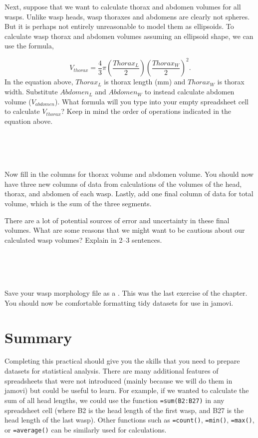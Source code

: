 \documentclass[
  openany]{krantz}
\begin{document}
Next, suppose that we want to calculate thorax and abdomen volumes for all wasps.
Unlike wasp heads, wasp thoraxes and abdomens are clearly not spheres.
But it is perhaps not entirely unreasonable to model them as ellipsoids.
To calculate wasp thorax and abdomen volumes assuming an ellipsoid shape, we can use the formula,

\[V_{thorax} = \frac{4}{3}\pi \left(\frac{Thorax_{L}}{2}\right)\left(\frac{Thorax_{W}}{2}\right)^{2}.\]
In the equation above, \(Thorax_{L}\) is thorax length (mm) and \(Thorax_{W}\) is thorax width.
Substitute \(Abdomen_{L}\) and \(Abdomen_{W}\) to instead calculate abdomen volume (\(V_{abdomen}\)).
What formula will you type into your empty spreadsheet cell to calculate \(V_{thorax}\)?
Keep in mind the order of operations indicated in the equation above.

\begin{verbatim}




\end{verbatim}

Now fill in the columns for thorax volume and abdomen volume.
You should now have three new columns of data from calculations of the volumes of the head, thorax, and abdomen of each wasp.
Lastly, add one final column of data for total volume, which is the sum of the three segments.

There are a lot of potential sources of error and uncertainty in these final volumes.
What are some reasons that we might want to be cautious about our calculated wasp volumes?
Explain in 2--3 sentences.

\begin{verbatim}




\end{verbatim}

Save your wasp morphology file as a .
This was the last exercise of the chapter.
You should now be comfortable formatting tidy datasets for use in jamovi.

\hypertarget{summary}{%
\section{Summary}\label{summary}}

Completing this practical should give you the skills that you need to prepare datasets for statistical analysis.
There are many additional features of spreadsheets that were not introduced (mainly because we will do them in jamovi) but could be useful to learn.
For example, if we wanted to calculate the sum of all head lengths, we could use the function \texttt{=sum(B2:B27)} in any spreadsheet cell (where B2 is the head length of the first wasp, and B27 is the head length of the last wasp).
Other functions such as \texttt{=count()}, \texttt{=min()}, \texttt{=max()}, or \texttt{=average()} can be similarly used for calculations.
\end{document}

